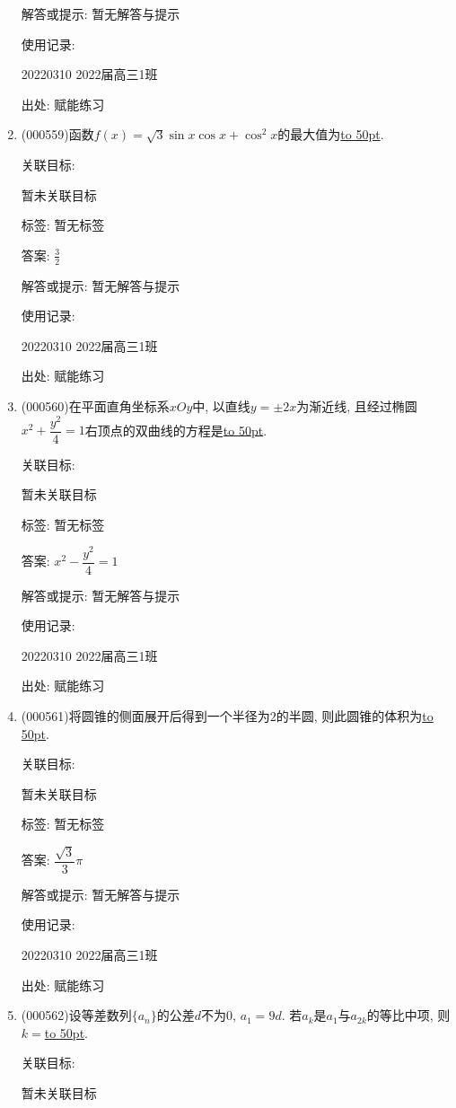 \documentclass[10pt,a4paper]{article}
\newcommand{\blank}[1]{\underline{\hbox to #1pt{}}}
\begin{document}
\begin{enumerate}[1.]
解答或提示: 暂无解答与提示

使用记录:

20220310	2022届高三1班	


出处: 赋能练习
\item { (000559)}函数$f(x)=\sqrt3\sin x\cos x+\cos^2x$的最大值为\blank{50}.


关联目标:

暂未关联目标



标签: 暂无标签

答案: $\frac 32$

解答或提示: 暂无解答与提示

使用记录:

20220310	2022届高三1班	


出处: 赋能练习
\item { (000560)}在平面直角坐标系$xOy$中, 以直线$y=\pm 2x$为渐近线, 且经过椭圆$x^2+\dfrac{y^2}4=1$右顶点的双曲线的方程是\blank{50}.


关联目标:

暂未关联目标



标签: 暂无标签

答案: $x^2-\dfrac{y^2}4=1$

解答或提示: 暂无解答与提示

使用记录:

20220310	2022届高三1班	


出处: 赋能练习
\item { (000561)}将圆锥的侧面展开后得到一个半径为$2$的半圆, 则此圆锥的体积为\blank{50}.


关联目标:

暂未关联目标



标签: 暂无标签

答案: $\dfrac{\sqrt 3}3\pi$

解答或提示: 暂无解答与提示

使用记录:

20220310	2022届高三1班	


出处: 赋能练习
\item { (000562)}设等差数列$\{a_n\}$的公差$d$不为$0$, $a_1=9d$. 若$a_k$是$a_1$与$a_{2k}$的等比中项, 则$k=$\blank{50}.


关联目标:

暂未关联目标




\end{enumerate}
\end{document}
